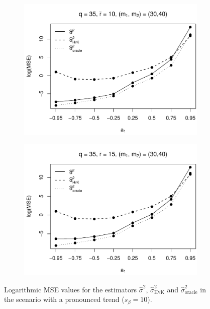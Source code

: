 \begin{figure}[p]
\begin{subfigure}[b]{0.45\textwidth}
\includegraphics[width=\textwidth]{Plots/Robustness/MSE_lrv_T=500_slope=10_(q,K1,K2,M1,M2)=(35,2,10,30,40).pdf}
\end{subfigure}
\hspace{0.25cm}
\begin{subfigure}[b]{0.45\textwidth}
\includegraphics[width=\textwidth]{Plots/Robustness/MSE_lrv_T=500_slope=10_(q,K1,K2,M1,M2)=(35,2,15,30,40).pdf}
\end{subfigure}
\caption{Logarithmic MSE values for the estimators $\widehat{\sigma}^2$, $\widehat{\sigma}^2_{\text{HvK}}$ and $\widehat{\sigma}^2_{\text{oracle}}$ in the scenario with a pronounced trend ($s_\beta=10$).}\label{fig:MSE_slope10_lrv_robust} 
\end{figure}



